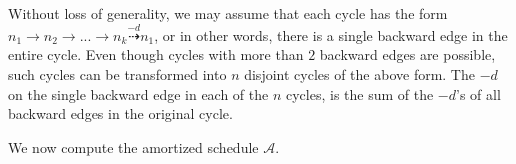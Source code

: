 \documentclass[sigconf, screen, natbib=false, dvipsnames, table]{acmart}
\theoremstyle{definition}
\begin{document}
Without loss of generality, we may assume that each cycle has the form $n_1 \rightarrow n_2 \rightarrow ... \rightarrow n_k \stackrel{-d}{\dasharrow} n_1$, 
or in other words, there is a single backward edge in the entire cycle. Even though cycles with more than $2$ backward 
edges are possible, such cycles can be transformed into $n$ disjoint cycles of the above form. The $-d$ on the
single backward edge in each of the $n$ cycles, is the sum of the $-d$'s of all backward edges in the original cycle. 

We now compute the amortized schedule $\mathcal{A}$. 
\end{document}
